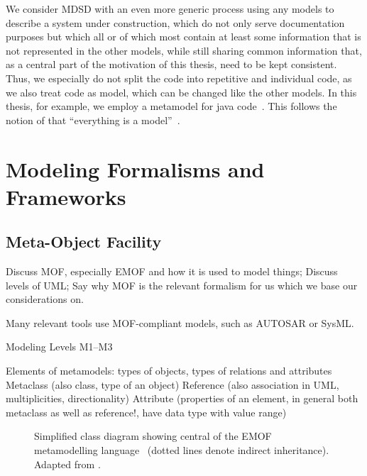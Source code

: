 We consider \gls{MDSD} with an even more generic process using any models to describe a system under construction, which do not only serve documentation purposes but which all or of which most contain at least some information that is not represented in the other models, while still sharing common information that, as a central part of the motivation of this thesis, need to be kept consistent.
Thus, we especially do not split the code into repetitive and individual code, as we also treat code as model, which can be changed like the other models.
In this thesis, for example, we employ a metamodel for java code~\cite{heidenreich2010jamopp-SLE}.
This follows the notion of \citeauthor{bezivin2005sosym} that \enquote{everything is a model}~\cite{bezivin2005sosym}.



\section{Modeling Formalisms and Frameworks}
\label{chap:foundations:formalisms}

\subsection{Meta-Object Facility}
\label{chap:foundations:formalisms:mof}
Discuss \gls{MOF}, especially \gls{EMOF} and how it is used to model things;
Discuss levels of UML;
Say why MOF is the relevant formalism for us which we base our considerations on.

Many relevant tools use MOF-compliant models, such as AUTOSAR or SysML.

Modeling Levels M1--M3

Elements of metamodels: types of objects, types of relations and attributes
Metaclass (also class, type of an object)
Reference (also association in UML, multiplicities, directionality)
Attribute (properties of an element, in general both metaclass as well as reference!, have data type with value range)

\begin{figure}
    \centering
    
    \caption[Simplified EMOF metamodelling language]{Simplified class diagram showing central \metaclasses of the EMOF metamodelling language~\cite[p. 27]{mof} (dotted lines denote indirect inheritance). Adapted from \cite[Fig. 2.2]{kramer2017a}.}
    \label{fig:foundations:emof}
\end{figure}


